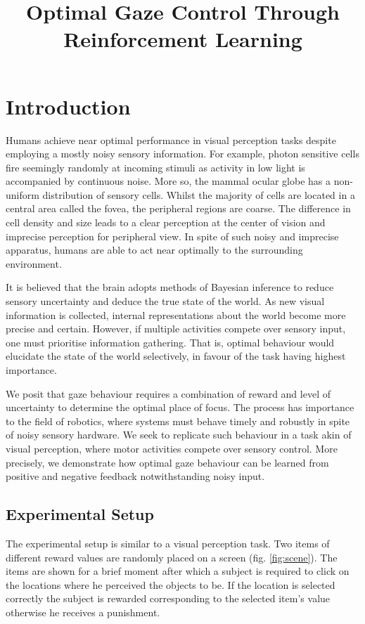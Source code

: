\documentclass[11]{article}
\author{}
\title{Optimal Gaze Control Through Reinforcement Learning}
\begin{document}
\maketitle 	

\section{Introduction}
Humans achieve near optimal performance in visual perception tasks\cite{najemnik2005,knill2004} despite employing a mostly noisy sensory information.
For example, photon sensitive cells fire seemingly randomly at incoming stimuli as activity in low light is accompanied by continuous noise\cite{baylor1984,vanrossum1998,field2002}.  
More so, the mammal ocular globe has a non-uniform distribution of sensory cells.
Whilst the majority of cells are located in a central area called the fovea, the peripheral regions are coarse\cite{jonas1992,purves2001}. 
The difference in cell density and size leads to a clear perception at the center of vision and imprecise perception for peripheral view.  
In spite of such noisy and imprecise apparatus, humans are able to act near optimally to the surrounding environment. 

It is believed that the brain adopts methods of Bayesian inference to reduce sensory uncertainty and deduce the true state of the world\cite{rao2010,knill2004}.
As new visual information is collected, internal representations about the world become more precise and certain.
However, if multiple activities compete over sensory input, one must prioritise information gathering.
That is, optimal behaviour would elucidate the state of the world selectively, in favour of the task having highest importance.

We posit that gaze behaviour requires a combination of reward and level of uncertainty to determine the optimal place of focus.
The process has importance to the field of robotics, where systems must behave timely and robustly in spite of noisy sensory hardware.
We seek to replicate such behaviour in a task akin of visual perception, where motor activities compete over sensory control. 
More precisely, we demonstrate how optimal gaze behaviour can be learned from positive and negative feedback notwithstanding noisy input.

\subsection{Experimental Setup}
The experimental setup is similar to a visual perception task.
Two items of different reward values are randomly placed on a screen (fig. \ref{fig:scene}).
The items are shown for a brief moment after which a subject is required to click on the locations where he perceived the objects to be. 
If the location is selected correctly the subject is rewarded corresponding to the selected item's value otherwise he receives a punishment.
\end{document}
